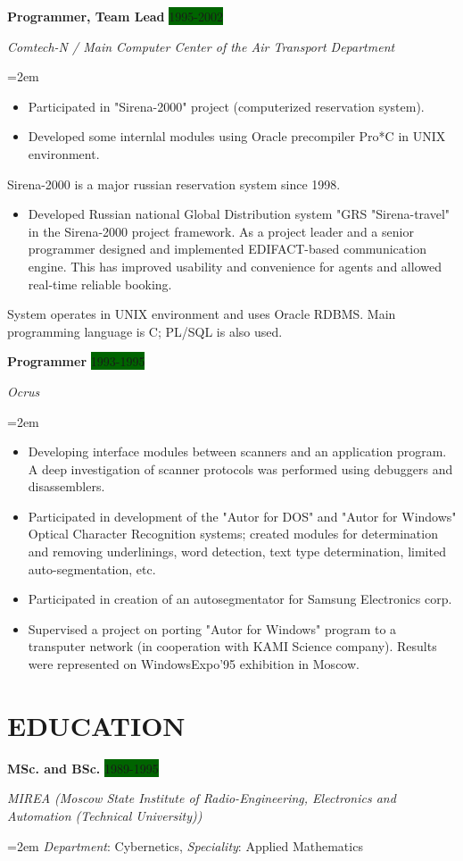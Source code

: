 \documentclass[paper=a4,fontsize=11pt]{scrartcl} %
\newcommand{\sepspace}{\vspace*{1em}}       %
\newcommand{\NewPart}[1]{\section*{\uppercase{#1}}}
\newcommand{\EducationEntry}[4]{\pagebreak[2]
        \noindent \textbf{#1} \hfill      %
        \colorbox{DarkGreen}{%
            \hfill\color{White}#2} \par  %
        \noindent \textit{#3} \par        %
        \noindent\hangindent=2em\hangafter=0 \small #4 %
        \normalsize \par}
\newcommand{\WorkEntry}[4]{\pagebreak[2]    %
        \noindent \textbf{#1} \hfill      %
        \colorbox{DarkGreen}{\color{White}#2} \par  %
        \noindent \textit{#3} \par        %
        \noindent\hangindent=2em\hangafter=0 \small #4 %
        \normalsize \par         \sepspace}
\begin{document}
\WorkEntry{Programmer, Team Lead}{1995-2002}{Comtech-N / Main Computer Center of the Air Transport Department}{
\begin{itemize}\itemsep0em
\item Participated in "Sirena-2000" project  (computerized reservation system).
\item Developed some internlal modules using Oracle precompiler Pro*C in UNIX environment. 
\end{itemize}  
Sirena-2000 is a major russian reservation system since 1998. 
\begin{itemize}\itemsep0em
\item Developed Russian national Global Distribution system "GRS "Sirena-travel" in the Sirena-2000 project framework. As a project leader and a senior programmer designed and implemented EDIFACT-based communication engine. This has improved usability and convenience for agents and allowed real-time reliable booking.
\end{itemize}
System operates in UNIX environment and uses Oracle RDBMS.
Main programming language is C; PL/SQL is also used.
}

\WorkEntry{Programmer}{1993-1995}{Ocrus}{
\begin{itemize}\itemsep0em
\item Developing interface modules between scanners and an application program. A deep investigation of scanner protocols was performed using debuggers and disassemblers.
\item Participated in development of the "Autor for DOS" and "Autor  for  Windows" Optical Character  Recognition systems; created modules for determination and removing underlinings, word detection, text type determination, limited auto-segmentation, etc.
\item Participated in creation of an autosegmentator for Samsung Electronics corp.
\item Supervised a project on porting "Autor for Windows" program to a transputer network (in cooperation with KAMI Science company). Results were represented on WindowsExpo'95 exhibition in Moscow.  
\end{itemize}
}


\NewPart{Education}{}

\EducationEntry{MSc. and BSc.}{1989-1995}{MIREA (Moscow State Institute of Radio-Engineering, Electronics and Automation (Technical University))}{\textit{Department}: Cybernetics, \textit{Speciality}: Applied Mathematics}
\sepspace
\end{document}

